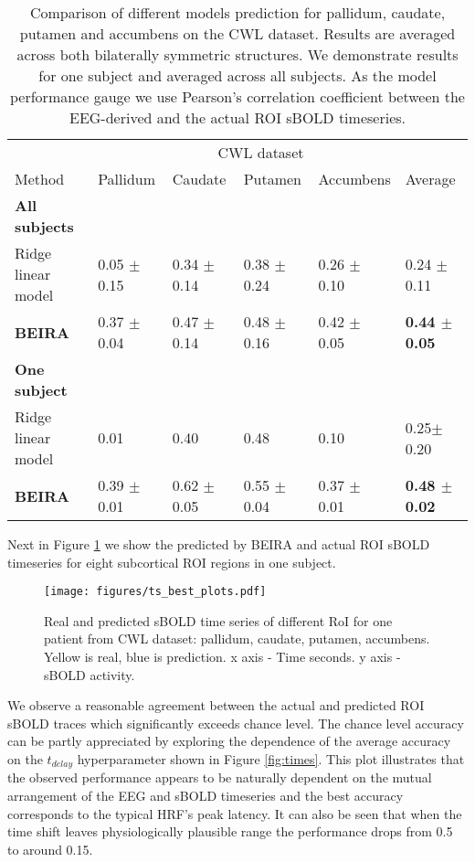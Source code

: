 \documentclass{article}
\begin{document}
\begin{table}[ht]
  \caption{ \label{table:results} Comparison of different models prediction for pallidum, caudate, putamen and accumbens on the CWL dataset. Results are averaged across both bilaterally symmetric structures. We demonstrate results for one subject and  averaged across all subjects. As the model performance gauge we use Pearson's correlation coefficient between the EEG-derived and the actual ROI sBOLD timeseries. 
  }
  \label{sample-table}
  \centering
  \begin{tabular}{llllll}
    \toprule
    \multicolumn{4}{r}{CWL dataset}\\                  
    \cmidrule(r){2-5}
    Method & Pallidum & Caudate & Putamen & Accumbens & Average \\
    \midrule
    \midrule
    \textbf{All subjects} & & & & & \\
    Ridge linear model     & 0.05 $\pm$ 0.15 & 0.34 $\pm$ 0.14 & 0.38 $\pm$ 0.24 & 0.26 $\pm$ 0.10 &  0.24 $\pm$ 0.11 \\
\midrule
    \textbf{BEIRA} & 0.37 $\pm$ 0.04 & 0.47 $\pm$ 0.14 & 0.48 $\pm$ 0.16 & 0.42 $\pm$ 0.05 &\textbf{0.44 $\pm$ 0.05}\\
    \midrule
    \midrule
    \textbf{One subject} & & & & & \\
    Ridge linear model     &0.01  & 0.40 & 0.48 & 0.10& 0.25$\pm$ 0.20\\
    \midrule
    \textbf{BEIRA}    & 0.39 $\pm$ 0.01  & 0.62 $\pm$ 0.05& 0.55 $\pm$ 0.04 &0.37 $\pm$ 0.01 & \textbf{0.48 $\pm$ 0.02} \\
    \bottomrule
  \end{tabular}
\end{table}

Next in Figure \ref{fig:ts_plot} we show the predicted by BEIRA and actual ROI sBOLD timeseries for eight subcortical ROI regions in one subject. 

\begin{figure}[ht]
    \centering
    \texttt{[image: figures/ts\_best\_plots.pdf]}
    \caption{\label{fig:ts_plot} Real and predicted sBOLD time series of different RoI for one patient from CWL dataset: pallidum, caudate, putamen, accumbens. Yellow is real, blue is prediction. x axis - Time seconds. y axis - sBOLD activity.
     }
\end{figure}

We observe a reasonable agreement between the actual and predicted ROI sBOLD traces which significantly exceeds chance level. The chance level accuracy can be partly appreciated by exploring the dependence of the average accuracy on the $t_{delay}$ hyperparameter shown in Figure \ref{fig:times}. This plot illustrates that the observed performance appears to be naturally dependent on the mutual arrangement of the EEG and sBOLD timeseries and the best accuracy corresponds to the typical HRF's peak latency. It can also be seen that when the time shift leaves physiologically plausible range the performance drops from 0.5 to around 0.15.        
\end{document}
